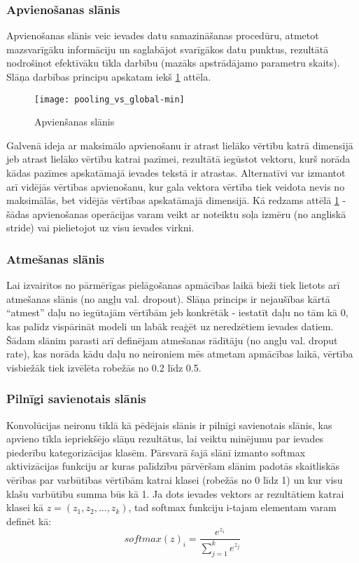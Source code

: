 \subsubsection{Apvienošanas slānis}

Apvienošanas slānis veic ievades datu samazināšanas procedūru, atmetot mazsvarīgāku informāciju un saglabājot svarīgākos datu punktus, rezultātā nodrošinot efektīvāku tīkla darbību (mazāks apstrādājamo parametru skaits). Slāņa darbības principu apskatam iekš \ref{fig:pooling_vs_global} attēla.

\begin{figure}[H]
	\texttt{[image: pooling\_vs\_global-min]}
	\caption{Apvienšanas slānis \cite{TextCNNLena}}
	\label{fig:pooling_vs_global}
\end{figure}

Galvenā ideja ar maksimālo apvienošanu ir atrast lielāko vērtību katrā dimensijā jeb atrast lielāko vērtību katrai pazīmei, rezultātā iegūstot vektoru, kurš norāda kādas pazīmes apskatāmajā ievades tekstā ir atrastas. Alternatīvi var izmantot arī vidējās vērtības apvienošanu, kur gala vektora vērtība tiek veidota nevis no maksimālās, bet vidējās vērtības apskatāmajā dimensijā. Kā redzams attēlā \ref{fig:pooling_vs_global} - šādas apvienošanas operācijas varam veikt ar noteiktu soļa izmēru (no angliskā stride) vai pielietojot uz visu ievades virkni. 

\subsubsection{Atmešanas slānis}
Lai izvairītos no pārmērīgas pielāgošanas apmācības laikā bieži tiek lietots arī atmešanas slānis (no angļu val. dropout). Slāņa princips ir nejaušības kārtā “atmest” daļu no iegūtajām vērtībām jeb konkrētāk - iestatīt daļu no tām kā 0, kas palīdz vispārināt modeli un labāk reaģēt uz neredzētiem ievades datiem. Šādam slānim parasti arī definējam atmešanas rādītāju (no angļu val. droput rate), kas norāda kādu daļu no neironiem mēs atmetam apmācības laikā, vērtība visbiežāk tiek izvēlēta robežās no 0.2 līdz 0.5.

\subsubsection{Pilnīgi savienotais slānis}
Konvolūcijas neironu tīklā kā pēdējais slānis ir pilnīgi savienotais slānis, kas apvieno tīkla iepriekšējo slāņu rezultātus, lai veiktu minējumu par ievades piederību kategorizācijas klasēm. Pārsvarā šajā slānī izmanto softmax aktivizācijas funkciju ar kuras palīdzību pārvēršam slānim padotās skaitliskās vērības par varbūtības vērtībām katrai klasei (robežās no 0 līdz 1) un kur visu klašu varbūtību summa būs kā 1. Ja dots ievades vektors ar rezultātiem katrai klasei kā \(z = (z_1, z_2, ..., z_k)\), tad softmax funkciju i-tajam elementam varam definēt kā:
\begin{equation}
softmax(z)_i = \frac{e^{z_i}}{\sum_{j=1}^{k} e^{z_j}}
\end{equation}

